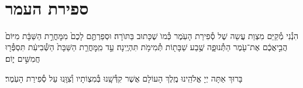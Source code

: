 \documentclass[twoside, openany, parskip=half, 11pt]{book}
\begin{document}
\quad{}\quad{}\\

\section{ספירת העמר}
\label{sefiras haomer}

הִנְ֯נִי מְ֯קַיֵּם מִצְוַת עֲשֵה שֶׁל סְ֯פִירַת הָעֽׂמֶר כְּ֯מוׂ שֶׁכָּתוּב בַּתּוׂרָה׃ וּסְפַרְתֶּ֤ם לָכֶם֙ מִמׇּחֳרַ֣ת הַשַּׁבָּ֔ת מִיּוֹם֙ הֲבִ֣יאֲכֶ֔ם אֶת־עֹ֖מֶר הַתְּ֯נוּפָ֑ה שֶׁ֥בַע שַׁבָּת֖וֹת תְּ֯מִימֹ֥ת תִּהְיֶֽינָה׃ עַ֣ד מִֽמׇּחֳרַ֤ת הַשַּׁבָּת֙ הַשְּׁ֯בִיעִ֔ת תִּסְפְּ֯ר֖וּ חֲמִשִּׁ֣ים י֑וֹם׃

בָּרוּךְ אַתָּה יְיָ אֱלֹהֵֽינוּ מֶֽלֶךְ הָעוֹלָם אֲשֶׁר קִדְּ֯שָֽׁנוּ בְּ֯מִצְוֹתָיו וְ֯צִוָּֽנוּ עַל סְ֯פִירַת הָעֹֽמֶר׃\\
\end{document}
